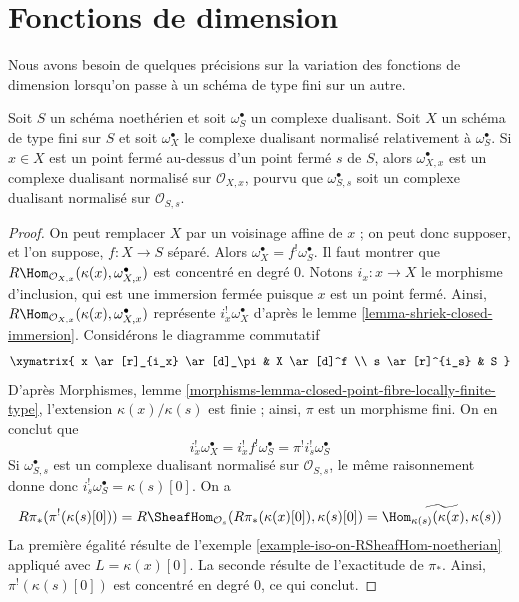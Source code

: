 \section{Fonctions de dimension}
\label{section-dimension-functions}

\noindent
Nous avons besoin de quelques précisions sur la variation des fonctions de dimension lorsqu'on passe à un schéma de type fini sur un autre.

\begin{lemma}
\label{lemma-good-dualizing-normalized}
Soit $S$ un schéma noethérien et soit $\omega_S^\bullet$ un complexe dualisant. Soit $X$ un schéma de type fini sur $S$ et soit $\omega_X^\bullet$ le complexe dualisant normalisé relativement à $\omega_S^\bullet$. Si $x \in X$ est un point fermé au-dessus d'un point fermé $s$ de $S$, alors $\omega_{X, x}^\bullet$ est un complexe dualisant normalisé sur $\mathcal{O}_{X, x}$, pourvu que $\omega_{S, s}^\bullet$ soit un complexe dualisant normalisé sur $\mathcal{O}_{S, s}$.
\end{lemma}

\begin{proof}
On peut remplacer $X$ par un voisinage affine de $x$ ; on peut donc supposer, et l'on suppose, $f : X \to S$ séparé. Alors $\omega_X^\bullet = f^!\omega_S^\bullet$. Il faut montrer que
$R\Hom_{\mathcal{O}_{X, x}}(\kappa(x), \omega_{X, x}^\bullet)$
est concentré en degré $0$. Notons $i_x : x \to X$ le morphisme d'inclusion, qui est une immersion fermée puisque $x$ est un point fermé. Ainsi, $R\Hom_{\mathcal{O}_{X, x}}(\kappa(x), \omega_{X, x}^\bullet)$ représente $i_x^!\omega_X^\bullet$ d'après le lemme \ref{lemma-shriek-closed-immersion}. Considérons le diagramme commutatif
$$
\xymatrix{
x \ar[r]_{i_x} \ar[d]_\pi & X \ar[d]^f \\
s \ar[r]^{i_s} & S
}
$$
D'après Morphismes, lemme \ref{morphisms-lemma-closed-point-fibre-locally-finite-type}, l'extension $\kappa(x)/\kappa(s)$ est finie ; ainsi, $\pi$ est un morphisme fini. On en conclut que
$$
i_x^!\omega_X^\bullet = i_x^! f^! \omega_S^\bullet =
\pi^! i_s^! \omega_S^\bullet
$$
Si $\omega_{S, s}^\bullet$ est un complexe dualisant normalisé sur $\mathcal{O}_{S, s}$, le même raisonnement donne donc $i_s^!\omega_S^\bullet = \kappa(s)[0]$. On a
$$
R\pi_*(\pi^!(\kappa(s)[0])) =
R\SheafHom_{\mathcal{O}_s}(R\pi_*(\kappa(x)[0]), \kappa(s)[0]) =
\widetilde{\Hom_{\kappa(s)}(\kappa(x), \kappa(s))}
$$
La première égalité résulte de l'exemple \ref{example-iso-on-RSheafHom-noetherian} appliqué avec $L = \kappa(x)[0]$. La seconde résulte de l'exactitude de $\pi_*$. Ainsi, $\pi^!(\kappa(s)[0])$ est concentré en degré $0$, ce qui conclut.
\end{proof}

